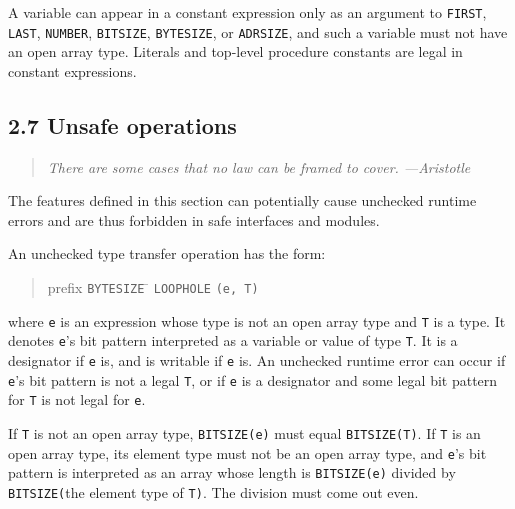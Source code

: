 \documentclass[10pt]{article}
\begin{document}
A variable can appear in a constant expression only as an argument to
\verb|FIRST|, \verb|LAST|, \verb|NUMBER|, \verb|BITSIZE|, \verb|BYTESIZE|, or
\verb|ADRSIZE|, and such a variable must not have an open array type.
Literals and top-level procedure constants are legal in constant expressions.

\subsection*{2.7 Unsafe operations}

\begin{quote}
  \emph{There are some cases that no law can be framed to cover.
    ---Aristotle}
\end{quote}

The features defined in this section can potentially cause unchecked runtime
errors and are thus forbidden in safe interfaces and modules.

An unchecked type transfer operation has the form:
\begin{quote}
  \begin{tabbing}
    prefix \= \verb|BYTESIZE| \= \kill
    \> \verb|LOOPHOLE| \> \verb|(e, T)|
  \end{tabbing}
\end{quote}
where \verb|e| is an expression whose type is not an open array type and
\verb|T| is a type.  It denotes \verb|e|'s bit pattern interpreted as a
variable or value of type \verb|T|.  It is a designator if \verb|e| is, and is
writable if \verb|e| is.  An unchecked runtime error can occur if \verb|e|'s
bit pattern is not a legal \verb|T|, or if \verb|e| is a designator and some
legal bit pattern for \verb|T| is not legal for \verb|e|.

If \verb|T| is not an open array type, \verb|BITSIZE(e)| must equal
\verb|BITSIZE(T)|.  If \verb|T| is an open array type, its element type must
not be an open array type, and \verb|e|'s bit pattern is interpreted as an
array whose length is \verb|BITSIZE(e)| divided by \verb|BITSIZE(|the element
type of \verb|T)|.  The division must come out even.
\end{document}

